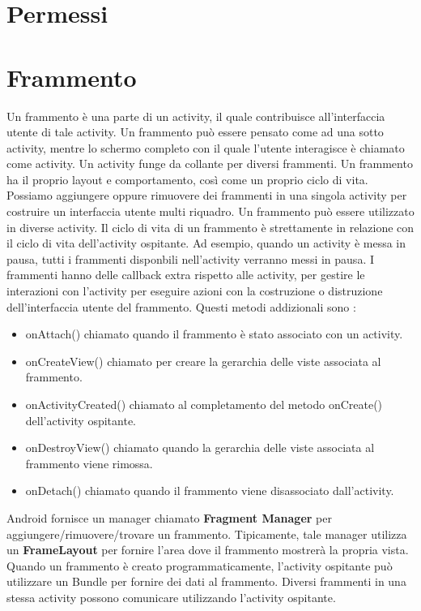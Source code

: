 \documentclass[12pt]{report}
\begin{document}
\section{Permessi}

\section{Frammento}
Un frammento è una parte di un activity, il quale contribuisce all'interfaccia utente di tale activity. Un frammento può essere pensato come ad una sotto activity, mentre lo schermo completo con il quale l'utente interagisce è chiamato come activity. Un activity funge da collante per diversi frammenti. Un frammento ha il proprio layout e comportamento, così come un proprio ciclo di vita. Possiamo aggiungere oppure rimuovere dei frammenti in una singola activity per costruire un interfaccia utente multi riquadro. Un frammento può essere utilizzato in diverse activity. Il ciclo di vita di un frammento è strettamente in relazione con il ciclo di vita dell'activity ospitante. Ad esempio, quando un activity è messa in pausa, tutti i frammenti disponbili nell'activity verranno messi in pausa. I frammenti hanno delle callback extra rispetto alle activity, per gestire le interazioni con l'activity per eseguire azioni con la costruzione o distruzione dell'interfaccia utente del frammento. Questi metodi addizionali sono :
\begin{itemize}
\item onAttach() chiamato quando il frammento è stato associato con un activity.
\item onCreateView() chiamato per creare la gerarchia delle viste associata al frammento.
\item onActivityCreated() chiamato al completamento del metodo onCreate() dell'activity ospitante.
\item onDestroyView() chiamato quando la gerarchia delle viste associata al frammento viene rimossa.
\item onDetach() chiamato quando il frammento viene disassociato dall'activity.
\end{itemize} 
Android fornisce un manager chiamato \textbf{Fragment Manager} per aggiungere/rimuovere/trovare un frammento. Tipicamente, tale manager utilizza un \textbf{FrameLayout} per fornire l'area dove il frammento mostrerà la propria vista. Quando un frammento è creato programmaticamente, l'activity ospitante può utilizzare un Bundle per fornire dei dati al frammento. Diversi frammenti in una stessa activity possono comunicare utilizzando l'activity ospitante.
\end{document}
